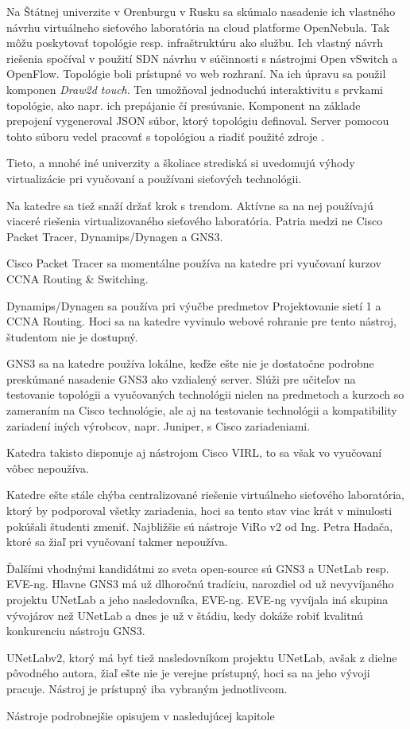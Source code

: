 Na Štátnej univerzite v Orenburgu v Rusku sa skúmalo nasadenie ich vlastného návrhu virtuálneho sieťového laboratória na cloud platforme OpenNebula. Tak môžu poskytovať topológie resp. infraštruktúru ako službu. Ich vlastný návrh riešenia spočíval v použití SDN návrhu v súčinnosti s nástrojmi Open vSwitch a OpenFlow. Topológie boli prístupné vo web rozhraní. Na ich úpravu sa použil komponen \emph{Draw2d touch}. Ten umožňoval jednoduchú interaktivitu s prvkami topológie, ako napr. ich prepájanie čí presúvanie. Komponent na základe prepojení vygeneroval JSON súbor, ktorý topológiu definoval. Server pomocou tohto súboru vedel pracovať s topológiou a riadiť použité zdroje \cite{opennebula_lab}.

Tieto, a mnohé iné univerzity a školiace strediská si uvedomujú výhody virtualizácie pri vyučovaní a používani sieťových technológii.

Na katedre sa tiež snaží držať krok s trendom. Aktívne sa na nej používajú viaceré riešenia virtualizovaného sieťového laboratória. Patria medzi ne Cisco Packet Tracer, Dynamips/Dynagen a GNS3.

Cisco Packet Tracer sa momentálne používa na katedre pri vyučovaní kurzov CCNA Routing \& Switching. 

Dynamips/Dynagen sa používa pri výučbe predmetov Projektovanie sietí 1 a CCNA Routing. Hoci sa na katedre vyvinulo webové rohranie pre tento nástroj, študentom nie je dostupný.

GNS3 sa na katedre používa lokálne, keďže ešte nie je dostatočne podrobne preskúmané nasadenie GNS3 ako vzdialený server. Slúži pre učiteľov na testovanie topológii a vyučovaných technológii nielen na predmetoch a kurzoch so zameraním na Cisco technológie, ale aj na testovanie technológii a kompatibility zariadení iných výrobcov, napr. Juniper, s Cisco zariadeniami.

Katedra takisto disponuje aj nástrojom Cisco VIRL, to sa však vo vyučovaní vôbec nepoužíva.

Katedre ešte stále chýba centralizované riešenie virtuálneho sieťového laboratória, ktorý by podporoval všetky zariadenia, hoci sa tento stav viac krát v minulosti pokúšali študenti zmeniť. Najbližšie sú nástroje ViRo v2 od Ing. Petra Hadača, ktoré sa žiaľ pri vyučovaní takmer nepoužíva.

Ďalšími vhodnými kandidátmi zo sveta open-source sú GNS3 a UNetLab resp. EVE-ng. Hlavne GNS3 má už dlhoročnú tradíciu, narozdiel od už nevyvíjaného projektu UNetLab a jeho nasledovníka, EVE-ng. EVE-ng vyvíjala iná skupina vývojárov než UNetLab a dnes je už v štádiu, kedy dokáže robiť kvalitnú konkurenciu nástroju GNS3.

UNetLabv2, ktorý má byť tiež nasledovníkom projektu UNetLab, avšak z dielne pôvodného autora, žiaľ ešte nie je verejne prístupný, hoci sa na jeho vývoji pracuje. Nástroj je prístupný iba vybraným jednotlivcom.

Nástroje podrobnejšie opisujem v nasledujúcej kapitole 
